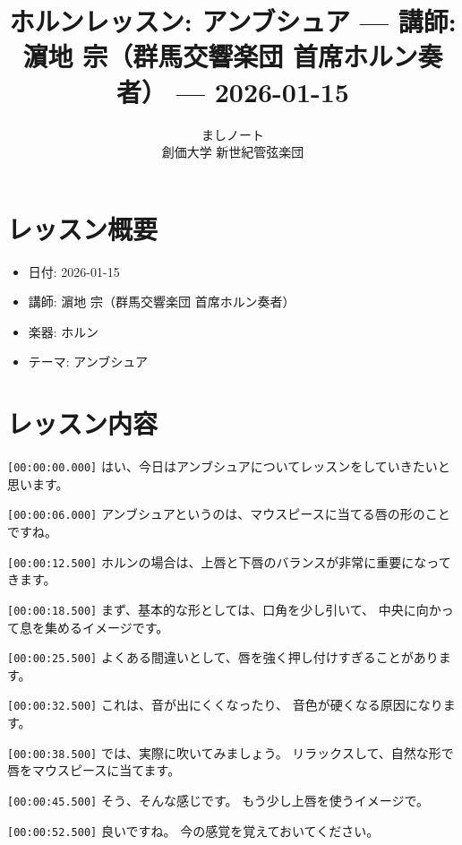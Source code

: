 \documentclass[a4paper,10pt,twocolumn]{ltjsarticle}
\begin{document}
\thispagestyle{firstpage}

\title{ホルンレッスン: アンブシュア --- 講師: 濵地 宗（群馬交響楽団 首席ホルン奏者） --- 2026-01-15}
\author{ましノート\\創価大学 新世紀管弦楽団}
\date{}

\maketitle

\tableofcontents
\newpage

\section{レッスン概要}

\begin{itemize}
  \item 日付: 2026-01-15
  \item 講師: 濵地 宗（群馬交響楽団 首席ホルン奏者）
  \item 楽器: ホルン
  \item テーマ: アンブシュア
\end{itemize}

\section{レッスン内容}

\texttt{[00:00:00.000]} はい、今日はアンブシュアについてレッスンをしていきたいと思います。

\texttt{[00:00:06.000]} アンブシュアというのは、マウスピースに当てる唇の形のことですね。

\texttt{[00:00:12.500]} ホルンの場合は、上唇と下唇のバランスが非常に重要になってきます。

\texttt{[00:00:18.500]} まず、基本的な形としては、口角を少し引いて、
中央に向かって息を集めるイメージです。

\texttt{[00:00:25.500]} よくある間違いとして、唇を強く押し付けすぎることがあります。

\texttt{[00:00:32.500]} これは、音が出にくくなったり、
音色が硬くなる原因になります。

\texttt{[00:00:38.500]} では、実際に吹いてみましょう。
リラックスして、自然な形で唇をマウスピースに当てます。

\texttt{[00:00:45.500]} そう、そんな感じです。
もう少し上唇を使うイメージで。

\texttt{[00:00:52.500]} 良いですね。
今の感覚を覚えておいてください。
\end{document}
